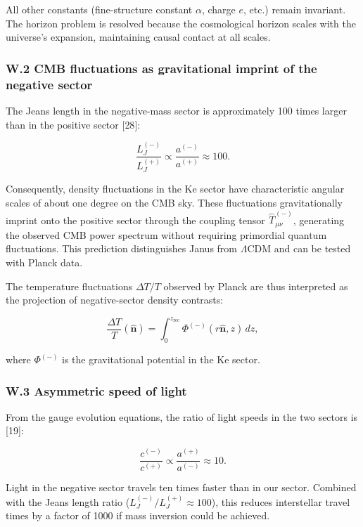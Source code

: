 \documentclass[11pt]{article}
\begin{document}
All other constants (fine-structure constant \(\alpha\), charge \(e\),
etc.) remain invariant. The horizon problem is resolved because the
cosmological horizon scales with the universe's expansion, maintaining
causal contact at all scales.

\hypertarget{w.2-cmb-fluctuations-as-gravitational-imprint-of-the-negative-sector}{%
\subsubsection{W.2 CMB fluctuations as gravitational imprint of the
negative
sector}\label{w.2-cmb-fluctuations-as-gravitational-imprint-of-the-negative-sector}}

The Jeans length in the negative-mass sector is approximately 100 times
larger than in the positive sector {[}28{]}:

\[
\frac{L_J^{(-)}}{L_J^{(+)}} \propto \frac{a^{(-)}}{a^{(+)}} \approx 100.
\]

Consequently, density fluctuations in the Ke sector have characteristic
angular scales of about one degree on the CMB sky. These fluctuations
gravitationally imprint onto the positive sector through the coupling
tensor \(\stackrel{\frown}{T}^{(-)}_{\mu\nu}\), generating the observed
CMB power spectrum without requiring primordial quantum fluctuations.
This prediction distinguishes Janus from \(\Lambda\)CDM and can be
tested with Planck data.

The temperature fluctuations \(\Delta T/T\) observed by Planck are thus
interpreted as the projection of negative-sector density contrasts:

\[
\frac{\Delta T}{T}(\hat{\mathbf{n}}) = \int_0^{z_{\text{rec}}} \Phi^{(-)}(r\hat{\mathbf{n}}, z) \, dz,
\]

where \(\Phi^{(-)}\) is the gravitational potential in the Ke sector.

\hypertarget{w.3-asymmetric-speed-of-light}{%
\subsubsection{W.3 Asymmetric speed of
light}\label{w.3-asymmetric-speed-of-light}}

From the gauge evolution equations, the ratio of light speeds in the two
sectors is {[}19{]}:

\[
\frac{c^{(-)}}{c^{(+)}} \propto \frac{a^{(+)}}{a^{(-)}} \approx 10.
\]

Light in the negative sector travels ten times faster than in our
sector. Combined with the Jeans length ratio
(\(L_J^{(-)}/L_J^{(+)} \approx 100\)), this reduces interstellar travel
times by a factor of 1000 if mass inversion could be achieved.
\end{document}
